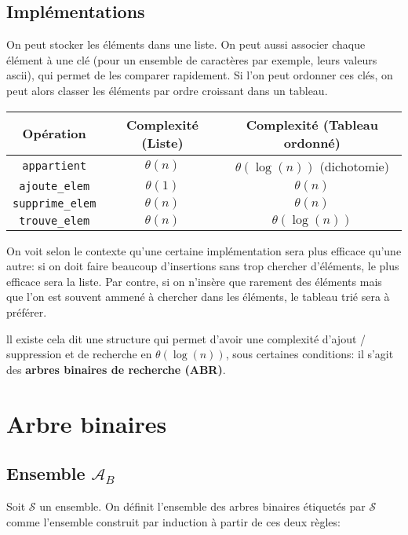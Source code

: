\documentclass{scrartcl}
\begin{document}
		\subsection{Implémentations}
			On peut stocker les éléments dans une liste. 
			On peut aussi associer chaque élément à une clé
			(pour un ensemble de caractères par exemple, leurs valeurs ascii),
			qui permet de les comparer rapidement. 
			Si l'on peut ordonner ces clés, 
			on peut alors classer les éléments par ordre croissant dans un tableau.

			\begin{center}
			\begin{tabular}{| c | c  | c |}
				\hline
				Opération & Complexité (Liste) & Complexité (Tableau ordonné) \\
				\hline
				\texttt{appartient} & $\theta(n)$ & $\theta(\log(n))$ (dichotomie) \\
				\hline
				\texttt{ajoute\_elem} & $\theta(1)$ & $\theta(n)$ \\
				\hline
				\texttt{supprime\_elem} & $\theta(n)$ & $\theta(n)$ \\
				\hline
				\texttt{trouve\_elem} & $\theta(n)$ & $\theta(\log(n))$ \\
				\hline
			\end{tabular}
			\end{center}

			\rem On voit selon le contexte qu'une certaine implémentation sera plus efficace qu'une autre:
			si on doit faire beaucoup d'insertions sans trop chercher d'éléments, le plus efficace sera la liste.
			Par contre, si on n'insère que rarement des éléments mais que 
			l'on est souvent ammené à chercher dans les éléments, le tableau trié sera à préférer.

			ll existe cela dit une structure qui permet d'avoir une complexité d'ajout / suppression et de recherche
			en $\theta(\log(n))$, sous certaines conditions: il s'agit des \textbf{arbres binaires de recherche (ABR)}.

	\section{Arbre binaires}
		\subsection{Ensemble \texorpdfstring{$\mathscr{A}_B$}{}}
			Soit $\mathcal{S}$ un ensemble.
			On définit l'ensemble des arbres binaires étiquetés par $\mathcal{S}$ 
			comme l'ensemble construit par induction à partir de ces deux règles:
\end{document}

